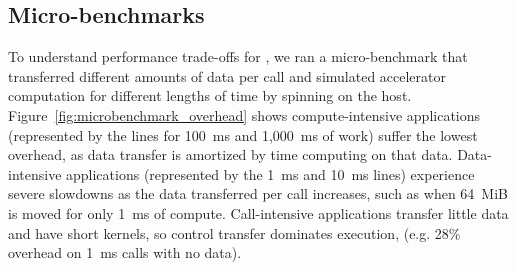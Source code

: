 \subsection{Micro-benchmarks}

To understand performance trade-offs for \AvA,
we ran a micro-benchmark that transferred different amounts of data per call and simulated accelerator computation for different lengths of time by spinning on the host.
Figure~\ref{fig:microbenchmark_overhead} shows compute-intensive applications (represented by the lines for 100~ms and 1,000~ms of work) suffer the lowest overhead, as data transfer is amortized by time computing on that data.
Data-intensive applications (represented by the 1~ms and 10~ms lines) experience severe slowdowns as the data transferred per call increases, such as when 64~MiB is moved for only 1~ms of compute.
Call-intensive applications transfer little data and have short kernels, so control transfer dominates execution, (e.g. 28\% overhead on 1~ms calls with no data).

